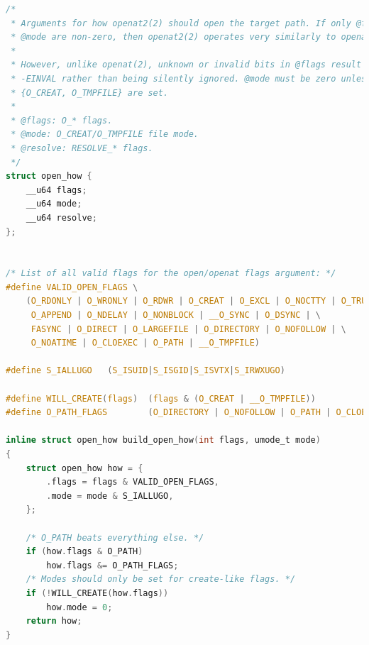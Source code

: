 \documentclass[a4paper,14pt]{extreport}
\begin{document}
\begin{lstlisting}[language=c, caption=Структура open_how и функция build_open_how()]
/*
 * Arguments for how openat2(2) should open the target path. If only @flags and
 * @mode are non-zero, then openat2(2) operates very similarly to openat(2).
 *
 * However, unlike openat(2), unknown or invalid bits in @flags result in
 * -EINVAL rather than being silently ignored. @mode must be zero unless one of
 * {O_CREAT, O_TMPFILE} are set.
 *
 * @flags: O_* flags.
 * @mode: O_CREAT/O_TMPFILE file mode.
 * @resolve: RESOLVE_* flags.
 */
struct open_how {
	__u64 flags;
	__u64 mode;
	__u64 resolve;
};


/* List of all valid flags for the open/openat flags argument: */
#define VALID_OPEN_FLAGS \
	(O_RDONLY | O_WRONLY | O_RDWR | O_CREAT | O_EXCL | O_NOCTTY | O_TRUNC | \
	 O_APPEND | O_NDELAY | O_NONBLOCK | __O_SYNC | O_DSYNC | \
	 FASYNC	| O_DIRECT | O_LARGEFILE | O_DIRECTORY | O_NOFOLLOW | \
	 O_NOATIME | O_CLOEXEC | O_PATH | __O_TMPFILE)
	 
#define S_IALLUGO	(S_ISUID|S_ISGID|S_ISVTX|S_IRWXUGO)

#define WILL_CREATE(flags)	(flags & (O_CREAT | __O_TMPFILE))
#define O_PATH_FLAGS		(O_DIRECTORY | O_NOFOLLOW | O_PATH | O_CLOEXEC)

inline struct open_how build_open_how(int flags, umode_t mode)
{
	struct open_how how = {
		.flags = flags & VALID_OPEN_FLAGS,
		.mode = mode & S_IALLUGO,
	};

	/* O_PATH beats everything else. */
	if (how.flags & O_PATH)
		how.flags &= O_PATH_FLAGS;
	/* Modes should only be set for create-like flags. */
	if (!WILL_CREATE(how.flags))
		how.mode = 0;
	return how;
}
\end{lstlisting}
\end{document}
